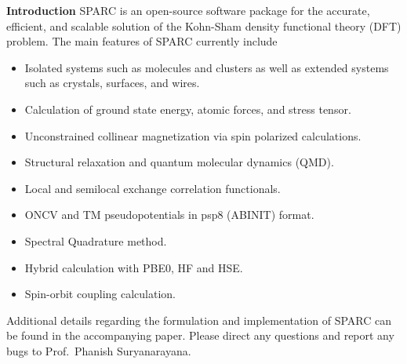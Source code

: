 \begin{frame}[allowframebreaks]{\textbf{Introduction}} \label{Introduction}
SPARC is an open-source software package for the accurate, efficient, and scalable solution of the Kohn-Sham density functional theory (DFT) problem. The main features of SPARC currently include
\begin{itemize}
  \item Isolated systems such as molecules and clusters as well as extended systems such as crystals, surfaces, and wires. 
  \item Calculation of ground state energy, atomic forces, and stress tensor.
  \item Unconstrained collinear magnetization via spin polarized calculations.
  \item Structural relaxation and quantum molecular dynamics (QMD). 
  \item Local and semilocal exchange correlation functionals. 
  \item ONCV and TM pseudopotentials in psp8 (ABINIT) format. 
  \item Spectral Quadrature method.
  \item Hybrid calculation with PBE0, HF and HSE.
  \item Spin-orbit coupling calculation.
\end{itemize}
Additional details regarding the formulation and implementation of SPARC can be found in the accompanying paper. Please direct any questions and report any bugs to Prof.~Phanish Suryanarayana.

\end{frame}



